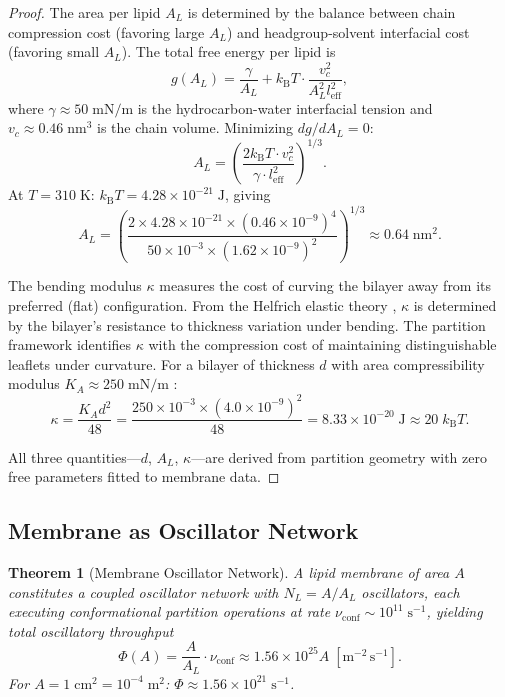 \documentclass[twocolumn,10pt]{article}
\newtheorem{theorem}{Theorem}[section]
\theoremstyle{remark}
\newcommand{\kB}{k_{\mathrm{B}}}
\begin{document}
\begin{proof}
The area per lipid $A_L$ is determined by the balance between chain compression cost (favoring large $A_L$) and headgroup-solvent interfacial cost (favoring small $A_L$). The total free energy per lipid is
\begin{equation}
g(A_L) = \frac{\gamma}{A_L} + \kB T \cdot \frac{v_c^2}{A_L^2 l_{\mathrm{eff}}^2},
\end{equation}
where $\gamma \approx 50\;\mathrm{mN/m}$ is the hydrocarbon-water interfacial tension \cite{israelachvili2011} and $v_c \approx 0.46\;\mathrm{nm}^3$ is the chain volume. Minimizing $dg/dA_L = 0$:
\begin{equation}
A_L = \left(\frac{2\kB T \cdot v_c^2}{\gamma \cdot l_{\mathrm{eff}}^2}\right)^{1/3}.
\end{equation}
At $T = 310\;\mathrm{K}$: $\kB T = 4.28 \times 10^{-21}\;\mathrm{J}$, giving
\begin{equation}
A_L = \left(\frac{2 \times 4.28 \times 10^{-21} \times (0.46 \times 10^{-9})^4}{50 \times 10^{-3} \times (1.62 \times 10^{-9})^2}\right)^{1/3} \approx 0.64\;\mathrm{nm}^2.
\label{eq:area_per_lipid}
\end{equation}

The bending modulus $\kappa$ measures the cost of curving the bilayer away from its preferred (flat) configuration. From the Helfrich elastic theory \cite{helfrich1973}, $\kappa$ is determined by the bilayer's resistance to thickness variation under bending. The partition framework identifies $\kappa$ with the compression cost of maintaining distinguishable leaflets under curvature. For a bilayer of thickness $d$ with area compressibility modulus $K_A \approx 250\;\mathrm{mN/m}$ \cite{lipowsky1995}:
\begin{equation}
\kappa = \frac{K_A d^2}{48} = \frac{250 \times 10^{-3} \times (4.0 \times 10^{-9})^2}{48} = 8.33 \times 10^{-20}\;\mathrm{J} \approx 20\;\kB T.
\label{eq:bending}
\end{equation}

All three quantities---$d$, $A_L$, $\kappa$---are derived from partition geometry with zero free parameters fitted to membrane data.
\end{proof}

\subsection{Membrane as Oscillator Network}

\begin{theorem}[Membrane Oscillator Network]
\label{thm:oscillator_network}
A lipid membrane of area $A$ constitutes a coupled oscillator network with $N_L = A / A_L$ oscillators, each executing conformational partition operations at rate $\nu_{\mathrm{conf}} \sim 10^{11}\;\mathrm{s}^{-1}$, yielding total oscillatory throughput
\begin{equation}
\Phi(A) = \frac{A}{A_L} \cdot \nu_{\mathrm{conf}} \approx 1.56 \times 10^{25} A\;[\mathrm{m}^{-2}\,\mathrm{s}^{-1}].
\label{eq:throughput}
\end{equation}
For $A = 1\;\mathrm{cm}^2 = 10^{-4}\;\mathrm{m}^2$: $\Phi \approx 1.56 \times 10^{21}\;\mathrm{s}^{-1}$.
\end{theorem}
\end{document}

